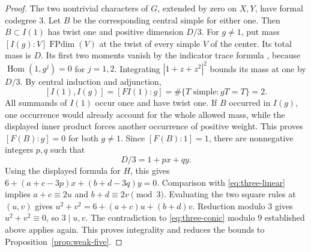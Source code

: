 \documentclass[11pt,a4paper]{article}
\numberwithin{equation}{section}
\begin{document}
\begin{proof}
The two nontrivial characters of $G$, extended by zero on $X,Y$, have
formal codegree $3$. Let $B$ be the corresponding central simple for either
one. Then $B\subset I(1)$ has twist one and positive dimension $D/3$.
For $g\ne1$, put mass $[I(g):V]\operatorname{FPdim}(V)$ at the
twist of every simple $V$ of the center.
Its total mass is $D$. Its first two moments vanish by the indicator trace
formula \cite[Theorem~4.1]{NSExp}, because $\operatorname{Hom}(1,g^j)=0$ for $j=1,2$. Integrating
$|1+z+z^2|^2$ bounds its mass at one by $D/3$.
By central induction and adjunction,
\[
 [I(1),I(g)]=[FI(1):g]=\#\{T\text{ simple}: gT=T\}=2.
\]
All summands of $I(1)$ occur once and have twist one. If $B$ occurred
in $I(g)$, one occurrence would already account for the whole allowed mass,
while the displayed inner product forces another occurrence of positive
weight. This proves $[F(B):g]=0$ for both $g\ne1$. Since $[F(B):1]=1$,
there are nonnegative integers $p,q$ such that
\[
 D/3=1+px+qy.
\]
Using the displayed formula for $H$, this gives
$6+(a+c-3p)x+(b+d-3q)y=0$. Comparison with
\eqref{eq:three-linear} implies
$a+c\equiv 2u$ and $b+d\equiv 2v\pmod3$. Evaluating the two square rules at
$(u,v)$ gives $u^2+v^2=6+(a+c)u+(b+d)v$. Reduction modulo $3$ gives
$u^2+v^2\equiv0$, so $3\mid u,v$. The contradiction to
\eqref{eq:three-conic} modulo $9$ established above applies again.
This proves integrality and reduces the bounds to Proposition~\ref{prop:weak-five}.
\end{proof}



\end{document}
